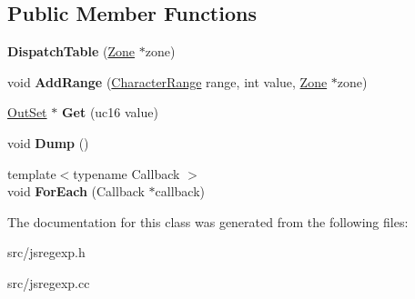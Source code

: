 \subsection*{Public Member Functions}
\begin{DoxyCompactItemize}
\item 
\hypertarget{classv8_1_1internal_1_1_dispatch_table_af4b64bc044ec5e385de4b27324604264}{}{\bfseries Dispatch\+Table} (\hyperlink{classv8_1_1internal_1_1_zone}{Zone} $\ast$zone)\label{classv8_1_1internal_1_1_dispatch_table_af4b64bc044ec5e385de4b27324604264}

\item 
\hypertarget{classv8_1_1internal_1_1_dispatch_table_a09e154202a1c257ae7a020333366c211}{}void {\bfseries Add\+Range} (\hyperlink{classv8_1_1internal_1_1_character_range}{Character\+Range} range, int value, \hyperlink{classv8_1_1internal_1_1_zone}{Zone} $\ast$zone)\label{classv8_1_1internal_1_1_dispatch_table_a09e154202a1c257ae7a020333366c211}

\item 
\hypertarget{classv8_1_1internal_1_1_dispatch_table_a4316210f600c6834dd57d63e6de4872a}{}\hyperlink{classv8_1_1internal_1_1_out_set}{Out\+Set} $\ast$ {\bfseries Get} (uc16 value)\label{classv8_1_1internal_1_1_dispatch_table_a4316210f600c6834dd57d63e6de4872a}

\item 
\hypertarget{classv8_1_1internal_1_1_dispatch_table_ae34f706102818431e69470a710ce64c4}{}void {\bfseries Dump} ()\label{classv8_1_1internal_1_1_dispatch_table_ae34f706102818431e69470a710ce64c4}

\item 
\hypertarget{classv8_1_1internal_1_1_dispatch_table_a600e5582b3e05d456c423454d61b0eba}{}{\footnotesize template$<$typename Callback $>$ }\\void {\bfseries For\+Each} (Callback $\ast$callback)\label{classv8_1_1internal_1_1_dispatch_table_a600e5582b3e05d456c423454d61b0eba}

\end{DoxyCompactItemize}


The documentation for this class was generated from the following files\+:\begin{DoxyCompactItemize}
\item 
src/jsregexp.\+h\item 
src/jsregexp.\+cc\end{DoxyCompactItemize}
